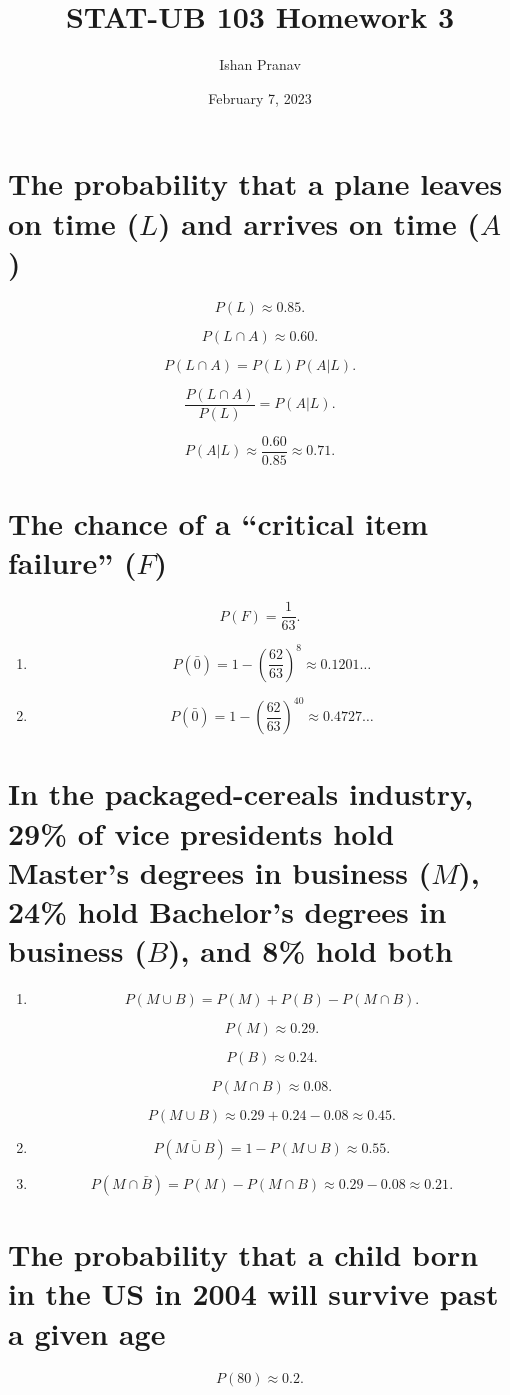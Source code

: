 \documentclass[12pt]{article}
\title{STAT-UB 103 Homework 3}
\author{Ishan Pranav}
\date{February 7, 2023}
\begin{document}
\maketitle
\section{The probability that a plane leaves on time ($L$) and arrives on time ($A$)}
\[P(L)\approx 0.85.\]

\[P(L\cap A)\approx 0.60.\]

\[P(L\cap A)=P(L)P(A|L).\]

\[\frac{P(L\cap A)}{P(L)}=P(A|L).\]

\[P(A|L)\approx\frac{0.60}{0.85}\approx 0.71.\]
\section{The chance of a ``critical item failure'' ($F$)}
\[P(F)=\frac{1}{63}.\]
\begin{enumerate}
    \item \[P(\bar{0})=1-\left(\frac{62}{63}\right)^8\approx 0.1201\dots\]
    \item \[P(\bar{0})=1-\left(\frac{62}{63}\right)^{40}\approx 0.4727\dots\]
\end{enumerate}
\section{In the packaged-cereals industry, 29\% of vice presidents hold Master’s degrees in business ($M$), 24\% hold Bachelor’s degrees in business ($B$), and 8\% hold both}
\begin{enumerate}
\item
\[P(M\cup B)=P(M)+P(B)-P(M\cap B).\]

\[P(M)\approx 0.29.\]

\[P(B)\approx 0.24.\]

\[P(M\cap B)\approx 0.08.\]

\[P(M\cup B)\approx 0.29+0.24-0.08\approx 0.45.\]
\item
\[P(\overline{M\cup B})=1-P(M\cup B)\approx 0.55.\]
\item
\[P(M\cap\bar{B})=P(M)-P(M\cap B)\approx 0.29-0.08\approx 0.21.\]
\end{enumerate}
\section{The probability that a child born in the US in 2004 will survive past a given age}
\[P(80)\approx 0.2.\]
\end{document}
